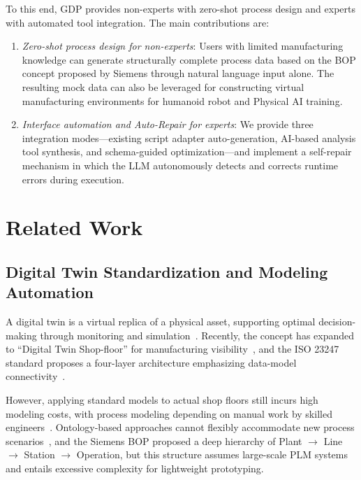 \documentclass[conference]{IEEEtran}
\begin{document}
To this end, GDP provides non-experts with zero-shot process design and experts with automated tool integration. The main contributions are:

\begin{enumerate}
\item \textit{Zero-shot process design for non-experts}: Users with limited manufacturing knowledge can generate structurally complete process data based on the BOP concept proposed by Siemens through natural language input alone. The resulting mock data can also be leveraged for constructing virtual manufacturing environments for humanoid robot and Physical AI training.

\item \textit{Interface automation and Auto-Repair for experts}: We provide three integration modes---existing script adapter auto-generation, AI-based analysis tool synthesis, and schema-guided optimization---and implement a self-repair mechanism in which the LLM autonomously detects and corrects runtime errors during execution.
\end{enumerate}

\section{Related Work}

\subsection{Digital Twin Standardization and Modeling Automation}

A digital twin is a virtual replica of a physical asset, supporting optimal decision-making through monitoring and simulation~\cite{b1}. Recently, the concept has expanded to ``Digital Twin Shop-floor'' for manufacturing visibility~\cite{b2}, and the ISO 23247 standard proposes a four-layer architecture emphasizing data-model connectivity~\cite{b3}.

However, applying standard models to actual shop floors still incurs high modeling costs, with process modeling depending on manual work by skilled engineers~\cite{b4}. Ontology-based approaches cannot flexibly accommodate new process scenarios~\cite{b5}, and the Siemens BOP proposed a deep hierarchy of Plant $\rightarrow$ Line $\rightarrow$ Station $\rightarrow$ Operation, but this structure assumes large-scale PLM systems and entails excessive complexity for lightweight prototyping.
\end{document}
